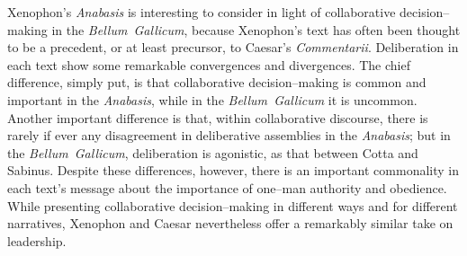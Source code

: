 \documentclass[12pt,letterpaper,oneside,final]{memoir}
\begin{document}
Xenophon's \emph{Anabasis} is interesting to consider in light of collaborative de\-cis\-ion--mak\-ing in the \emph{Bellum~Gallicum}, because Xenophon's text has often been thought to be a precedent, or at least precursor, to Caesar's \emph{Commentarii}. Deliberation in each text show some remarkable convergences and divergences. The chief difference, simply put, is that collaborative decision--making is common and important in the \emph{Anabasis}, while in the \emph{Bellum~Gallicum} it is uncommon. Another important difference is that, within collaborative discourse,  there is rarely if ever any disagreement in deliberative assemblies in the \emph{Anabasis}; but in the \emph{Bellum~Gallicum}, deliberation is agonistic, as that between Cotta and Sabinus. Despite these differences, however, there is an important commonality in each text's message about the importance of one--man authority and obedience. While presenting collaborative decision--making in different ways and for different narratives, Xenophon and Caesar nevertheless offer a remarkably similar take on leadership.
\end{document}
